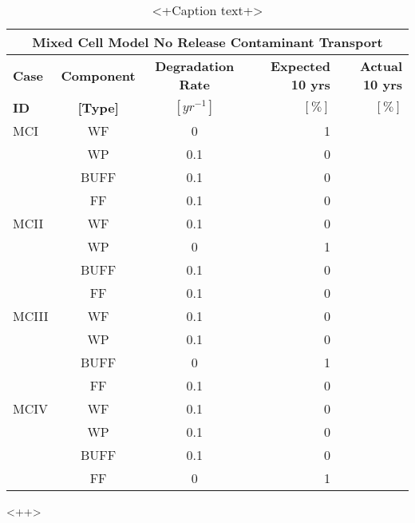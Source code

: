 \begin{table}
\centering
\begin{tabular}{|l|c|c|r|r|}
  \hline
  \multicolumn{5}{c}{\textbf{Mixed Cell Model No Release Contaminant Transport}}\\
  \hline
  \textbf{Case}  &  \textbf{Component} &  \textbf{Degradation Rate} & \textbf{Expected 10 yrs} & \textbf{Actual 10 yrs}\\
  \textbf{ID}    & \textbf{[Type]} &  \textbf{$[yr^{-1}]$}  &  $[\%]$  & $[\%]$\\
  \hline
  MCI     &  WF    &  0   & 1\\
          &  WP    &  0.1 & 0\\
          &  BUFF  &  0.1 & 0\\
          &  FF    &  0.1 & 0\\
  \hline
  MCII    &  WF    &  0.1 & 0\\
          &  WP    &  0   & 1\\
          &  BUFF  &  0.1 & 0\\
          &  FF    &  0.1 & 0\\
  \hline
  MCIII   &  WF    &  0.1 & 0\\
          &  WP    &  0.1 & 0\\
          &  BUFF  &  0   & 1\\
          &  FF    &  0.1 & 0\\
  \hline
  MCIV    &  WF    &  0.1 & 0\\
          &  WP    &  0.1 & 0\\
          &  BUFF  &  0.1 & 0\\
          &  FF    &  0   & 1\\
  \hline
\end{tabular}
\caption{<+Caption text+>}
\label{tab:<+label+>}
\end{table}<++>
